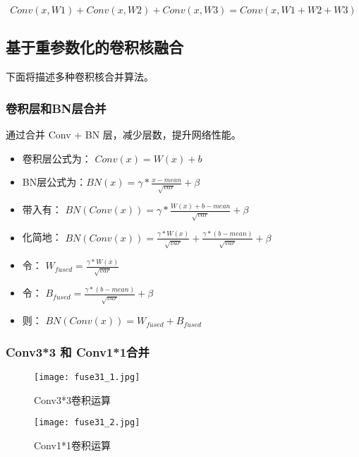 \begin{equation}
    Conv(x, W1) + Conv(x, W2) + Conv(x, W3) = Conv(x, W1+W2+W3)
\end{equation}

\subsection{基于重参数化的卷积核融合}

下面将描述多种卷积核合并算法。

\subsubsection{卷积层和BN层合并}

通过合并 Conv + BN 层，减少层数，提升网络性能。

\begin{itemize}
    \item 卷积层公式为： $Conv(x) = W(x) + b$
    \item BN层公式为：$BN(x) = \gamma * \frac{x-mean}{\sqrt{var}} + \beta$
    \item 带入有： $BN(Conv(x)) = \gamma * \frac{W(x) + b - mean}{\sqrt{var}} + \beta$
    \item 化简地： $BN(Conv(x)) = \frac{\gamma * W(x)}{\sqrt{var}} + \frac{\gamma * (b - mean)}{\sqrt{var}} + \beta$
    \item 令：   $W_{fused} = \frac{\gamma * W(x)}{\sqrt{var}}$
    \item 令：   $B_{fused} = \frac{\gamma * (b - mean)}{\sqrt{var}} + \beta$
    \item 则： $BN(Conv(x)) = W_{fused} + B_{fused}$
\end{itemize}

\subsubsection{Conv3*3 和 Conv1*1合并}

\begin{figure}[]
    \centering
    \texttt{[image: fuse31\_1.jpg]}	%
    \caption{Conv3*3卷积运算}
    \label{fig:fuse31-1} %
\end{figure}

\begin{figure}[]
    \centering
    \texttt{[image: fuse31\_2.jpg]}	%
    \caption{Conv1*1卷积运算}
    \label{fig:fuse31-2} %
\end{figure}

